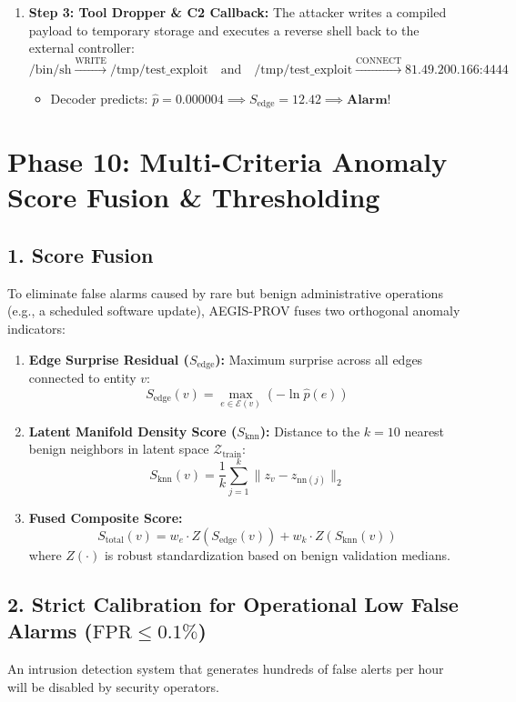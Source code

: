 \documentclass[11pt,a4paper]{report}
\begin{document}
\begin{enumerate}
    \item \textbf{Step 3: Tool Dropper \& C2 Callback:}
    The attacker writes a compiled payload to temporary storage and executes a reverse shell back to the external controller:
    $$\text{/bin/sh} \xrightarrow{\text{WRITE}} \text{/tmp/test\_exploit} \quad \text{and} \quad \text{/tmp/test\_exploit} \xrightarrow{\text{CONNECT}} \text{81.49.200.166:4444}$$
    \begin{itemize}
        \item Decoder predicts: $\hat{p} = 0.000004 \implies S_{\text{edge}} = 12.42 \implies \mathbf{Alarm!}$
    \end{itemize}
\end{enumerate}

\section{Phase 10: Multi-Criteria Anomaly Score Fusion \& Thresholding}

\subsection{1. Score Fusion}
To eliminate false alarms caused by rare but benign administrative operations (e.g., a scheduled software update), AEGIS-PROV fuses two orthogonal anomaly indicators:
\begin{enumerate}
    \item \textbf{Edge Surprise Residual ($S_{\text{edge}}$):} Maximum surprise across all edges connected to entity $v$:
    $$S_{\text{edge}}(v) = \max_{e \in \mathcal{E}(v)} \left( -\ln \hat{p}(e) \right)$$
    \item \textbf{Latent Manifold Density Score ($S_{\text{knn}}$):} Distance to the $k=10$ nearest benign neighbors in latent space $\mathcal{Z}_{\text{train}}$:
    $$S_{\text{knn}}(v) = \frac{1}{k} \sum_{j=1}^k \| z_v - z_{\text{nn}(j)} \|_2$$
    \item \textbf{Fused Composite Score:}
    $$S_{\text{total}}(v) = w_e \cdot Z(S_{\text{edge}}(v)) + w_k \cdot Z(S_{\text{knn}}(v))$$
    where $Z(\cdot)$ is robust standardization based on benign validation medians.
\end{enumerate}

\subsection{2. Strict Calibration for Operational Low False Alarms \texorpdfstring{($\text{FPR} \le 0.1\%$)}{(FPR <= 0.1\%)}}
An intrusion detection system that generates hundreds of false alerts per hour will be disabled by security operators. 
\end{document}
